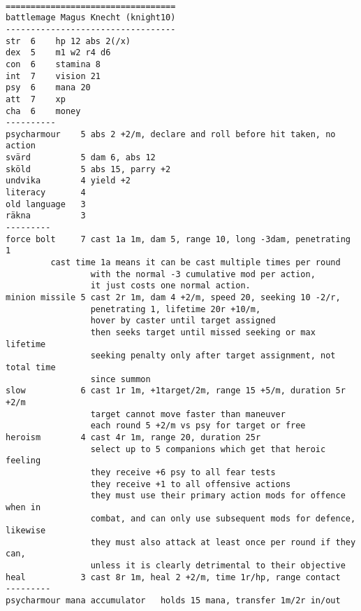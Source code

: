 \

\goodbreak
\tiny \begin{samepage} \begin{verbatim}
==================================
battlemage Magus Knecht (knight10)
----------------------------------
str  6    hp 12 abs 2(/x)
dex  5    m1 w2 r4 d6
con  6    stamina 8
int  7    vision 21
psy  6    mana 20
att  7    xp
cha  6    money
----------
psycharmour    5 abs 2 +2/m, declare and roll before hit taken, no action
svärd          5 dam 6, abs 12
sköld          5 abs 15, parry +2
undvika        4 yield +2
literacy       4
old language   3
räkna          3
---------
force bolt     7 cast 1a 1m, dam 5, range 10, long -3dam, penetrating 1
		 cast time 1a means it can be cast multiple times per round
                 with the normal -3 cumulative mod per action,
                 it just costs one normal action.
minion missile 5 cast 2r 1m, dam 4 +2/m, speed 20, seeking 10 -2/r,
                 penetrating 1, lifetime 20r +10/m,
                 hover by caster until target assigned
                 then seeks target until missed seeking or max lifetime
                 seeking penalty only after target assignment, not total time
                 since summon
slow           6 cast 1r 1m, +1target/2m, range 15 +5/m, duration 5r +2/m
                 target cannot move faster than maneuver
                 each round 5 +2/m vs psy for target or free
heroism        4 cast 4r 1m, range 20, duration 25r
                 select up to 5 companions which get that heroic feeling
                 they receive +6 psy to all fear tests
                 they receive +1 to all offensive actions
                 they must use their primary action mods for offence when in
                 combat, and can only use subsequent mods for defence, likewise
                 they must also attack at least once per round if they can,
                 unless it is clearly detrimental to their objective
heal           3 cast 8r 1m, heal 2 +2/m, time 1r/hp, range contact
---------
psycharmour mana accumulator   holds 15 mana, transfer 1m/2r in/out
\end{verbatim} \end{samepage} \normalsize



